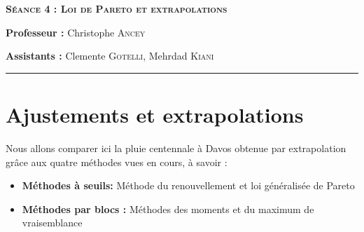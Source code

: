 \documentclass[a4paper]{article}
\begin{document}
\pagestyle{fancy}
\fancyhead{}



\huge
\textsc{\textbf{Séance 4 :  Loi de Pareto et extrapolations}}


\small
   \vspace{10pt}
    \textbf{Professeur :} Christophe \textsc{Ancey} 

    \vspace{10pt}
   \textbf{Assistants :} Clemente \textsc{Gotelli}, Mehrdad \textsc{Kiani} \\
    \vspace{10pt}
\hrule
\small

\section*{Ajustements et extrapolations}

Nous allons comparer ici la pluie centennale à Davos obtenue par extrapolation grâce aux quatre méthodes vues en cours, à savoir :\\

\begin{itemize}
 \item \textbf{Méthodes à seuils:} Méthode du renouvellement et loi généralisée de Pareto

 \item \textbf{Méthodes par blocs : }Méthodes des moments et du maximum de vraisemblance

\end{itemize}
\end{document}
